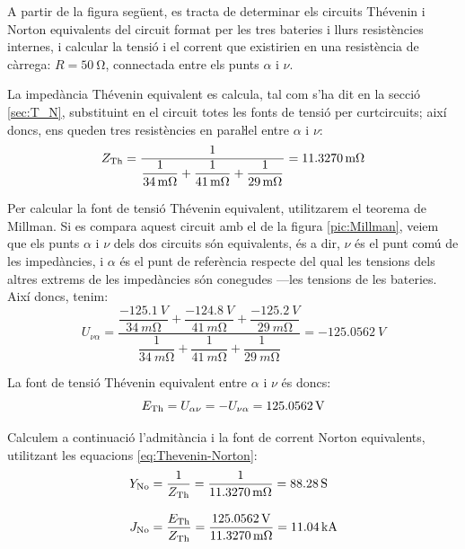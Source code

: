 \begin{exemple}\label{ex:MillmanBateries}
	\addcontentsxms{\MillmanBateries}
    A partir de la figura següent, es tracta de determinar els circuits
    Thévenin i Norton equivalents del circuit format per les tres
    bateries i llurs resistències internes, i calcular la tensió i el
    corrent que existirien en una resistència de càrrega:
    $R=\qty{50}{\ohm}$, connectada entre els punts $\alpha$
    i $\nu$.

    \begin{center}
        
    \end{center}

    La impedància Thévenin equivalent es calcula, tal com s'ha dit en la secció \ref{sec:T_N},
    substituint en el circuit totes les fonts de tensió per curtcircuits; així doncs, ens
    queden tres resistències en paraŀlel entre $\alpha$ i $\nu$:
    \[
    Z_\mathrm{Th} = \frac{1}{\dfrac{1}{\qty{34}{\milli\ohm}} +
    \dfrac{1}{\qty{41}{\milli\ohm}} + \dfrac{1}{\qty{29}{\milli\ohm}}} =
    \qty{11,3270}{\milli\ohm}
    \]

    Per calcular la font de tensió Thévenin equivalent, utilitzarem el
    teorema de Millman. Si es compara aquest circuit amb el de la figura
    \vref{pic:Millman}, veiem que els punts $\alpha$ i $\nu$ dels dos
    circuits són equivalents, és a dir, $\nu$ és el punt comú de les
    impedàncies, i $\alpha$ és el punt de referència respecte del qual les tensions  dels altres extrems de les impedàncies
    són conegudes ---les tensions de les bateries. Així doncs, tenim:
    \[
    U_{\nu\alpha} = \frac{\dfrac{\qty{-125,1}{V}}{\qty{34}{m\ohm}} +
    \dfrac{\qty{-124,8}{V}}{\qty{41}{m\ohm}} +
    \dfrac{\qty{-125,2}{V}}{\qty{29}{m\ohm}}}{\dfrac{1}{\qty{34}{m\ohm}}
    + \dfrac{1}{\qty{41}{m\ohm}} + \dfrac{1}{\qty{29}{m\ohm}}} =
    \qty{-125,0562}{V}
    \]

    La font de tensió  Thévenin equivalent entre $\alpha$ i $\nu$ és doncs:
    \[
    E_\mathrm{Th} = U_{\alpha\nu} = -U_{\nu\alpha} = \qty{125,0562}{V}
    \]

    Calculem a continuació l'admitància i la font de corrent  Norton equivalents, utilitzant
    les equacions \eqref{eq:Thevenin-Norton}:
    \begin{align*}
        Y_\mathrm{No} &= \frac{1}{Z_\mathrm{Th}} = \frac{1}{\qty{11,3270}{m\ohm}} = \qty{88,28}{S}
        \\[2ex]
        J_\mathrm{No} &= \frac{E_\mathrm{Th}}{Z_\mathrm{Th}} =
        \frac{\qty{125,0562}{V}}{\qty{11,3270}{m\ohm}}= \qty{11,04}{kA}
    \end{align*}


\end{exemple}
